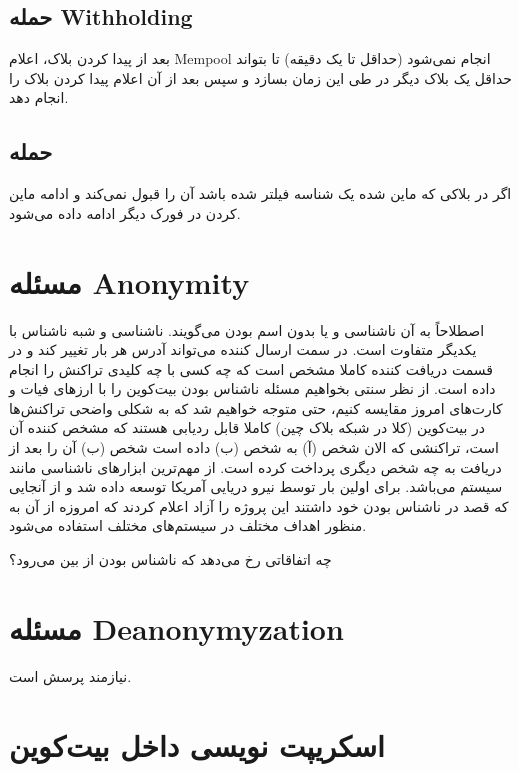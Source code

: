 \documentclass[10pt, a4paper]{article}
\begin{document}
\subsection{حمله Withholding}

بعد از پیدا کردن بلاک، اعلام Mempool انجام نمی‌شود (حداقل تا یک دقیقه) تا بتواند
حداقل یک بلاک دیگر در طی این زمان بسازد و سپس بعد از آن اعلام پیدا کردن بلاک را
انجام دهد.

\subsection{حمله }

اگر در بلاکی که ماین شده یک شناسه فیلتر شده باشد آن را قبول نمی‌کند و ادامه ماین
کردن در فورک دیگر ادامه داده می‌شود.

\section{مسئله Anonymity}

اصطلاحاً به آن ناشناسی و یا بدون اسم بودن می‌گویند. ناشناسی و شبه ناشناس با
یکدیگر متفاوت است. در سمت ارسال کننده می‌تواند آدرس  هر بار تغییر
کند و در قسمت دریافت کننده کاملا مشخص است که چه کسی با چه کلیدی تراکنش را انجام
داده است. از نظر سنتی بخواهیم مسئله ناشناس بودن بیت‌کوین را با ارز‌های فیات و
کارت‌های امروز مقایسه کنیم، حتی متوجه خواهیم شد که به شکلی واضحی تراکنش‌ها در
بیت‌کوین (کلا در شبکه بلاک چین) کاملا قابل ردیابی هستند که مشخص کننده آن است،
تراکنشی که الان شخص (آ) به شخص (ب) داده است شخص (ب) آن را بعد از دریافت به چه
شخص دیگری پرداخت کرده است. از مهم‌ترین ابزار‌های ناشناسی مانند سیستم 
می‌باشد.  برای اولین بار توسط نیرو دریایی آمریکا توسعه داده شد و از
آنجایی که قصد در ناشناس بودن خود داشتند این پروژه را آزاد اعلام کردند که امروزه
از آن به منظور اهداف مختلف در سیستم‌های مختلف استفاده می‌شود.

چه اتفاقاتی رخ می‌دهد که ناشناس بودن از بین می‌رود؟

\section{مسئله Deanonymyzation}

نیازمند پرسش است.

\section{اسکریپت نویسی داخل بیت‌کوین}
\end{document}
